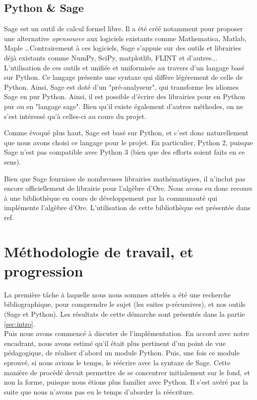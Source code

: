 \documentclass[final,12pt]{article}
\begin{document}
    \subsection{Python \& Sage}
        \label{ssec:sage}
        \par Sage est un outil de calcul formel libre.
        Il a été créé notamment pour proposer
        une alternative \textit{opensource} aux logiciels existants comme Mathematica,
        Matlab, Maple \ldots Contrairement à ces logiciels, Sage s'appuie sur des outils
        et librairies déjà existants comme NumPy, SciPy, matplotlib, FLINT et d'autres...
        L'utilisation de ces outils et unifiée et uniformisée au travers d'un langage
        basé sur Python. Ce langage présente une syntaxe qui diffère légérement de celle
        de Python. Ainsi, Sage est doté d'un "pré-analyseur",
        qui transforme les idiomes Sage en pur Python.
        Ainsi, il est possible d'écrire des librairies pour en Python pur ou en "langage sage".
        Bien qu'il existe également d'autres méthodes, on ne s'est intéressé qu'à celles-ci au
        cours du projet.
        \par Comme évoqué plus haut, Sage est basé sur Python, et c'est donc naturellement
        que nous avons choisi ce langage pour le projet.
        En particulier, Python 2, puisque Sage n'est pas compatible avec Python 3
        (bien que des efforts soient faits en ce sens).
        \par Bien que Sage fournisse de nombreuses librairies mathématiques,
        il n'inclut pas encore officiellement de librairie pour l'algèbre d'Ore.
        Nous avons eu donc recours à une bibliothèque en cours de développement par
        la communauté qui implémente l'algèbre d'Ore. L'utilisation de cette bibliothèque
        est présentée dans {\color{red} ref}.
\section{Méthodologie de travail, et progression}
    \label{sec:methodo}
    \par La première tâche à laquelle nous nous sommes attelés a été une recherche bibliographique,
    pour comprendre le sujet (les suites p-récursives), et nos outils (Sage et Python).
    Les résultats de cette démarche sont présentés dans la partie \ref{sec:intro}.\\
    Puis nous avons commencé à discuter de l'implémentation. En accord avec notre encadrant,
    nous avons estimé qu'il était plus pertinent d'un point de vue pédagogique, de réaliser
    d'abord un module Python. Puis, une fois ce module eprouvé, si nous avions le temps,
    le réécrire avec la syntaxe de Sage. Cette manière de procédé devait permettre de se
    concentrer initialement sur le fond, et non la forme, puisque nous étions plus familier
    avec Python. {\color{blue} Il s'est avéré par la suite que nous n'avons pas eu le temps
    d'aborder la réécriture}.
\end{document}
